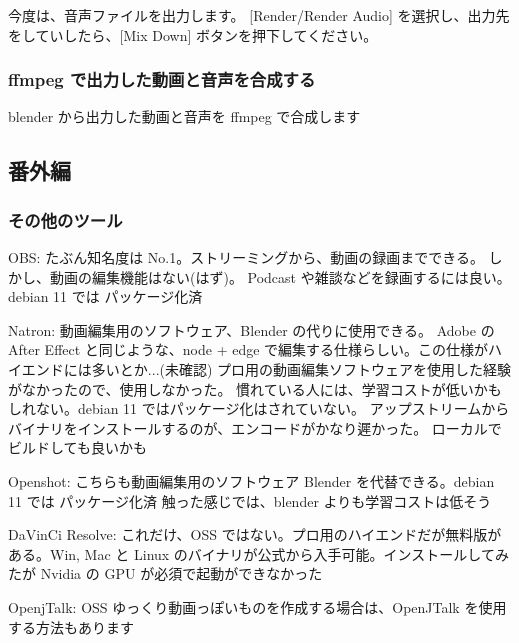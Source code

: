 \documentclass[mingoth,a4paper]{jsarticle}
\begin{document}
今度は、音声ファイルを出力します。
[Render/Render Audio] を選択し、出力先をしていしたら、[Mix Down] ボタンを押下してください。 

\subsubsection{ffmpeg で出力した動画と音声を合成する}

blender から出力した動画と音声を ffmpeg で合成します


\subsection{番外編}
\subsubsection{その他のツール}
\begin{description}
\item{OBS:
たぶん知名度は No.1。ストリーミングから、動画の録画までできる。
しかし、動画の編集機能はない(はず)。
Podcast や雑談などを録画するには良い。debian 11 では パッケージ化済}
\vspace{1em}

\item{Natron:
動画編集用のソフトウェア、Blender の代りに使用できる。
Adobe の After Effect と同じような、node + edge で編集する仕様らしい。この仕様がハイエンドには多いとか...(未確認)
プロ用の動画編集ソフトウェアを使用した経験がなかったので、使用しなかった。
慣れている人には、学習コストが低いかもしれない。debian 11 ではパッケージ化はされていない。
アップストリームからバイナリをインストールするのが、エンコードがかなり遲かった。
ローカルでビルドしても良いかも}
\vspace{1em}

\item{Openshot:
こちらも動画編集用のソフトウェア Blender を代替できる。debian 11 では パッケージ化済
触った感じでは、blender よりも学習コストは低そう}
\vspace{1em}

\item{DaVinCi Resolve:
これだけ、OSS ではない。プロ用のハイエンドだが無料版がある。Win, Mac と Linux のバイナリが公式から入手可能。インストールしてみたが Nvidia の GPU が必須で起動ができなかった}
\vspace{1em}

\item{OpenjTalk:
OSS ゆっくり動画っぽいものを作成する場合は、OpenJTalk を使用する方法もあります}
\vspace{1em}

\end{description}
\end{document}
